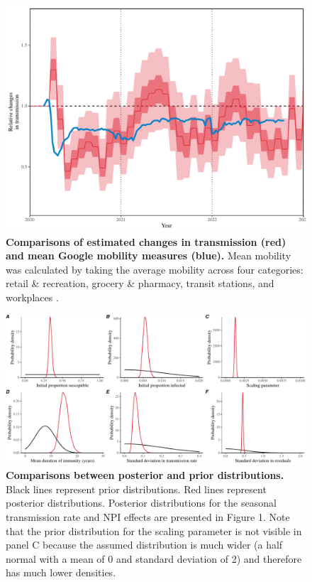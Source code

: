 \documentclass[12pt]{article}
\begin{document}
\pagebreak

\begin{figure}[!ht]
\includegraphics[width=\textwidth]{../figure_mobility/figure_mobility_new.pdf}
\caption{
\textbf{Comparisons of estimated changes in transmission (red) and mean Google mobility measures (blue).}
Mean mobility was calculated by taking the average mobility across four categories: retail \& recreation, grocery \& pharmacy, transit stations, and workplaces \citep{park2024predicting}.
}
\end{figure}


\pagebreak

\begin{figure}[!ht]
\includegraphics[width=\textwidth]{../figure1/figure1_posterior.pdf}
\caption{
\textbf{Comparisons between posterior and prior distributions.}
Black lines represent prior distributions.
Red lines represent posterior distributions.
Posterior distributions for the seasonal transmission rate and NPI effects are presented in Figure 1.
Note that the prior distribution for the scaling parameter is not visible in panel C because the assumed distribution is much wider (a half normal with a mean of 0 and standard deviation of 2) and therefore has much lower densities.
}
\end{figure}
\end{document}
